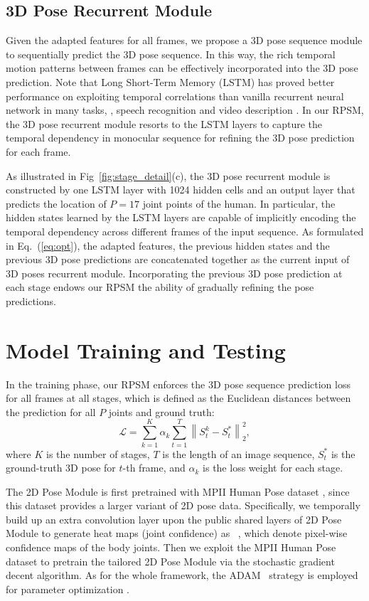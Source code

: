 \documentclass[10pt,twocolumn,letterpaper]{article}
\begin{document}
\subsection{3D Pose Recurrent Module}
Given the adapted features for all frames, we propose a 3D pose sequence module to sequentially predict the 3D pose sequence. In this way, the rich temporal motion patterns between frames can be effectively incorporated into the 3D pose prediction. Note that Long Short-Term Memory (LSTM) \cite{Hochreiter1997Long} has proved better performance on exploiting temporal correlations than vanilla recurrent neural network in many tasks, \eg, speech recognition \cite{graves2014towards} and video description \cite{donahue2015long}. 
In our RPSM, the 3D pose recurrent module resorts to the LSTM layers to capture the temporal dependency in monocular sequence for refining the 3D pose prediction for each frame. 

As illustrated in Fig~\ref{fig:stage_detail}(c), the 3D pose recurrent module is constructed by one LSTM layer with 1024 hidden cells and an output layer that predicts the location of $P=17$ joint points of the human. In particular, the hidden states learned by the LSTM layers are capable of implicitly encoding the temporal dependency across different frames of the input sequence. As formulated in Eq.~(\ref{eq:opt}), the adapted features, the previous hidden states and the previous 3D pose predictions are concatenated together as the current input of 3D poses recurrent module. Incorporating the previous 3D pose prediction at each stage endows our RPSM the ability of gradually refining the pose predictions. 


\section{Model Training and Testing}
In the training phase, our RPSM enforces the 3D pose sequence prediction loss for all frames at all stages, which is defined as the Euclidean distances between the prediction for all $P$ joints and ground truth:
\begin{equation}
\label{eq:loss_func}
\mathcal{L}=\sum_{k=1}^{K} \alpha_k \sum_{t=1}^{T} \left \| S_t^k - S_t^* \right \|_{2}^{2},
\end{equation}
where $K$ is the number of stages, $T$ is the length of an image sequence, $S_t^*$ is the ground-truth 3D pose for $t$-th frame, and $\alpha_k$ is the loss weight for each stage. 

The 2D Pose Module is first pretrained with MPII Human Pose dataset \cite{andriluka14cvpr}, since this dataset provides a larger variant of 2D pose data. Specifically, we temporally build up an extra convolution layer upon the public shared layers of 2D Pose Module to generate heat maps (joint confidence) as ~\cite{jt14nips}, which denote pixel-wise confidence maps of the body joints. Then we exploit the MPII Human Pose dataset \cite{andriluka14cvpr} to pretrain the tailored 2D Pose Module via the stochastic gradient decent algorithm. As for the whole framework, the ADAM~\cite{Kingma2014Adam} strategy is employed for parameter optimization .
\end{document}
